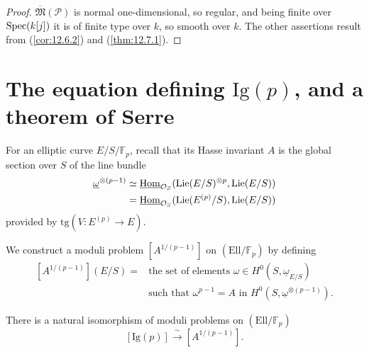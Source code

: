\begin{proof}
$\overline{\mathfrak{M}}(\mathcal{P})$ is normal one-dimensional, so regular, and being finite over $\operatorname{Spec}(k[j])$ it is of finite type over $k$, so smooth over $k$. The other assertions result from (\ref{cor:12.6.2}) and (\ref{thm:12.7.1}).
\end{proof}

\section{The equation defining \texorpdfstring{$\mathrm{Ig}(p)$}{Ig(p)}, and a theorem of Serre}
\label{sec:12.8}

\kmitem\label{item:12.8.1}
For an elliptic curve $E/S/\mathbb{F}_p$, recall that its Hasse invariant $A$ is the global section over $S$ of the line bundle
\begin{align*}
\underline{\omega}^{\otimes(p-1)} &\simeq \underline{\operatorname{Hom}}_{\mathcal{O}_S}(\operatorname{Lie}(E/S)^{\otimes p}, \operatorname{Lie}(E/S)) \\
&= \underline{\operatorname{Hom}}_{\mathcal{O}_S}(\operatorname{Lie}(E^{(p)}/S), \operatorname{Lie}(E/S))
\end{align*}
provided by $\mathrm{tg}(V : E^{(p)} \to E)$.

We construct a moduli problem $[A^{1/(p-1)}]$ on $(\mathrm{Ell}/\mathbb{F}_p)$ by defining
\begin{equation}\label{eq:12.8.1.1}
\begin{aligned}
{}[A^{1/(p-1)}](E/S) = {}& \text{the set of elements } \omega \in H^0(S, \underline{\omega}_{E/S}) \\
&\text{such that } \omega^{p-1} = A \text{ in } H^0(S, \underline{\omega}^{\otimes(p-1)}) .
\end{aligned}
\end{equation}

\begin{kthm}\label{thm:12.8.2}
There is a natural isomorphism of moduli problems on $(\mathrm{Ell}/\mathbb{F}_p)$
\[
[\mathrm{Ig}(p)] \xrightarrow{\ \sim\ } [A^{1/(p-1)}] .
\]
\end{kthm}

